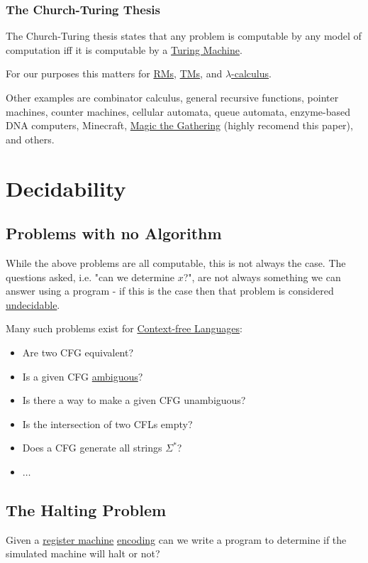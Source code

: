 \documentclass{article}
\begin{document}
\subsubsection{The Church-Turing Thesis}
The Church-Turing thesis states that any problem is computable by any model of computation iff it is computable by a \hyperref[tm]{Turing Machine}.

For our purposes this matters for \hyperref[rm]{RMs}, \hyperref[tm]{TMs}, and \hyperref[lambda-calculus]{$\lambda$-calculus}.

Other examples are combinator calculus, general recursive functions, pointer machines, counter machines, cellular automata, queue automata, enzyme-based DNA computers, Minecraft, \href{https://arxiv.org/pdf/1904.09828.pdf}{Magic the Gathering} (highly recomend this paper), and others.

\newpage

\section{Decidability}
\subsection{Problems with no Algorithm}
While the above problems are all computable, this is not always the case. The questions asked, i.e. "can we determine $x$?", are not always something we can answer using a program - if this is the case then that problem is considered \hyperref[undecidable]{undecidable}.

Many such problems exist for \hyperref[cfl]{Context-free Languages}:
\begin{itemize}
    \item Are two CFG equivalent?
    \item Is a given CFG \hyperref[ambiguity]{ambiguous}?
    \item Is there a way to make a given CFG unambiguous?
    \item Is the intersection of two CFLs empty?
    \item Does a CFG generate all strings $\Sigma^*$?
    \item $\dots$
\end{itemize}

\subsection{The Halting Problem}\label{halting}
Given a \hyperref[rm]{register machine} \hyperref[encoding]{encoding} can we write a program to determine if the simulated machine will halt or not?
\end{document}
